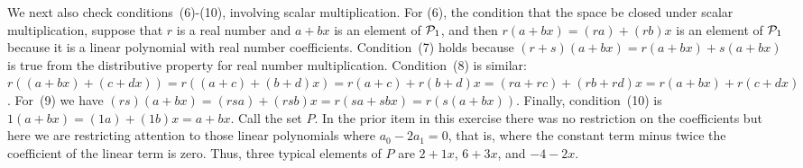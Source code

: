 \begin{exercises}
\begin{answer}
\begin{exparts}
          We next also check conditions~(6)-(10), involving 
          scalar multiplication.
          For (6), the condition that the space be closed under scalar
          multiplication, 
          suppose that $r$ is a real number and $a+bx$ is an element of
          $\mathcal{P}_1$, and then $r(a+bx)=(ra)+(rb)x$ is an element of 
          $\mathcal{P}_1$ because it is a linear polynomial with real
          number coefficients.
          Condition~(7) holds because 
          $(r+s)(a+bx)=r(a+bx)+s(a+bx)$ is true from the distributive property
          for real number multiplication.
          Condition~(8) is similar: 
          $r((a+bx)+(c+dx))=r((a+c)+(b+d)x)=r(a+c)+r(b+d)x=(ra+rc)+(rb+rd)x
          =r(a+bx)+r(c+dx)$.
          For~(9) we have 
          $(rs)(a+bx)=(rsa)+(rsb)x=r(sa+sbx)=r(s(a+bx))$.
          Finally, condition~(10) is 
          $1(a+bx)=(1a)+(1b)x=a+bx$.
        \partsitem 
          Call the set $P$.
          In the prior item in this exercise 
          there was no restriction on the coefficients
          but here we are restricting attention to those linear polynomials
          where $a_0-2a_1=0$, that is, 
          where the constant term minus twice the coefficient of the linear
          term is zero. 
          Thus, three typical elements of $P$ are
          $2+1x$, $6+3x$, and $-4-2x$.


\end{exparts}
\end{answer}
\end{exercises}
